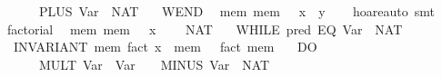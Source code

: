 \begin{isabellebody}
\ \ \ \ {}\ {}{}\ PLUS\ {}Var\ {}{}\ {}NAT\ {}{}\isanewline
\ \ WEND{}\isanewline
\ \ {}{}mem{}\ mem\ {}\ {}\ {}x\ {}\ y{}{}{}{}\isanewline
%
\isadelimproof
\ \ %
\endisadelimproof
%
\isatagproof
{}\isamarkupfalse%
\ hoare{}auto\ smt%
\endisatagproof
{\isafoldproof}%
%
\isadelimproof
\isanewline
%
\endisadelimproof
\isanewline
{}\isamarkupfalse%
\ factorial{}\isanewline
\ \ {}{}{}mem{}\ mem\ {}\ {}\ x{}{}\isanewline
\ \ {}\ {}{}\ NAT\ {}{}\isanewline
\ \ {}WHILE\ {}{}pred\ {}EQ\ {}Var\ {}{}\ {}NAT\ {}{}{}{}\isanewline
\ \ INVARIANT\ {}mem{}\ fact\ x\ {}\ mem\ {}\ {}\ fact\ {}mem\ {}{}{}\isanewline
\ \ DO\isanewline
\ \ \ \ {}\ {}{}\ MULT\ {}Var\ {}{}\ {}Var\ {}{}{}\ {}\ {}{}\ MINUS\ {}Var\ {}{}\ {}NAT\ {}{}\isanewline

\end{isabellebody}
